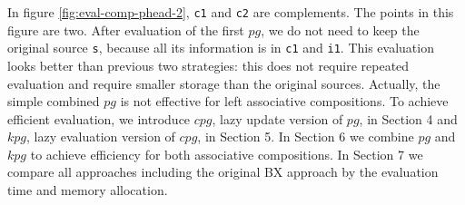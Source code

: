 In figure \ref{fig:eval-comp-phead-2}, \texttt{c1} and \texttt{c2} are complements. The points in this figure are two. After evaluation of the first $pg$, we do not need to keep the original source \texttt{s}, because all its information is in \texttt{c1} and \texttt{i1}. 
This evaluation looks better than previous two strategies: this does not require repeated evaluation and require smaller storage than the original sources. 
Actually, the simple combined $pg$ is not effective for left associative compositions. To achieve efficient evaluation, we introduce $cpg$, lazy update version of $pg$, in Section 4 and $kpg$, lazy evaluation version of $cpg$, in Section 5. In Section 6 we combine $pg$ and $kpg$ to achieve efficiency for both associative compositions. In Section 7 we compare all approaches including the original BX approach by the evaluation time and memory allocation. 










